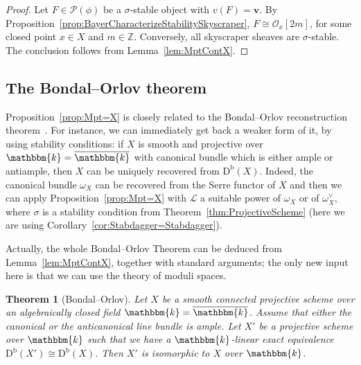 \documentclass[11pt, reqno]{amsart}
\numberwithin{equation}{section}
\theoremstyle{plain}
\newtheorem{theorem}{Theorem}[section]
\theoremstyle{remark}
\theoremstyle{definition}
\theoremstyle{italicsname}
\newcommand{\bv}{\mathbf{v}}
\newcommand{\Db}{\mathrm{D^b}}
\newcommand{\cO}{\mathcal{O}}
\newcommand{\cL}{\mathcal{L}}
\newcommand{\cP}{\mathscr{P}}
\newcommand{\KK}{\mathbbm{k}}
\def\ZZ{\ensuremath{\mathbb{Z}}}
\begin{document}
\begin{proof}
Let $F\in\cP(\phi)$ be a $\sigma$-stable object with $v(F)=\bv$.
By Proposition~\ref{prop:BayerCharacterizeStabilitySkyscraper}, $F\cong\cO_x[2m]$, for some closed point $x\in X$ and $m\in\ZZ$.
Conversely, all skyscraper sheaves are $\sigma$-stable.
The conclusion follows from Lemma~\ref{lem:MptContX}.
\end{proof}


\subsection{The Bondal--Orlov theorem} 
Proposition~\ref{prop:Mpt=X} is closely related to the Bondal--Orlov reconstruction theorem~\cite{BO}.
For instance, we can immediately get back a weaker form of it, by using stability conditions: if $X$ is smooth and projective over $\KK=\overline{\KK}$ with canonical bundle which is either ample or antiample, then $X$ can be uniquely recovered from $\Db(X)$.
Indeed, the canonical bundle $\omega_X$ can be recovered from the Serre functor of $X$ and then we can apply Proposition~\ref{prop:Mpt=X} with $\cL$ a suitable power of $\omega_X$ or of $\omega_X^\vee$, where $\sigma$ is a stability condition from Theorem~\ref{thm:ProjectiveScheme} (here we are using Corollary~\ref{cor:Stabdagger=Stabdagger}).

Actually, the whole Bondal--Orlov Theorem can be deduced from Lemma~\ref{lem:MptContX}, together with standard arguments; the only new input here is that we can use the theory of moduli spaces. 

\begin{theorem}[Bondal--Orlov]\label{thm:BOreconstruction}
Let $X$ be a smooth connected projective scheme over an algebraically closed field $\KK=\overline{\KK}$.
Assume that either the canonical or the anticanonical line bundle is ample.
Let $X'$ be a projective scheme over $\KK$ such that we have a $\KK$-linear exact equivalence $\Db(X')\cong\Db(X)$.
Then $X'$ is isomorphic to $X$ over $\KK$.
\end{theorem}
\end{document}
